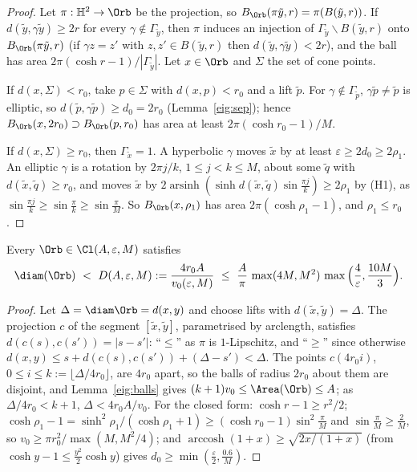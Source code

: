 \begin{proof}
Let $\pi:\mathbb H^2\to\Orb$ be the projection, so $B_\Orb(\pi\tilde y,r)=\pi(B(\tilde y,r))$. If $d(\tilde y,\gamma\tilde y)\ge2r$ for every $\gamma\notin\Gamma_{\tilde y}$, then $\pi$ induces an injection of $\Gamma_{\tilde y}\backslash B(\tilde y,r)$ onto $B_\Orb(\pi\tilde y,r)$ (if $\gamma z=z'$ with $z,z'\in B(\tilde y,r)$ then $d(\tilde y,\gamma\tilde y)<2r$), and the ball has area $2\pi(\cosh r-1)/|\Gamma_{\tilde y}|$. Let $x\in\Orb$ and $\Sigma$ the set of cone points.

If $d(x,\Sigma)<r_0$, take $p\in\Sigma$ with $d(x,p)<r_0$ and a lift $\tilde p$. For $\gamma\notin\Gamma_{\tilde p}$, $\gamma\tilde p\ne\tilde p$ is elliptic, so $d(\tilde p,\gamma\tilde p)\ge d_0=2r_0$ (Lemma~\ref{eig:sep}); hence $B_\Orb(x,2r_0)\supset B_\Orb(p,r_0)$ has area at least $2\pi(\cosh r_0-1)/M$.

If $d(x,\Sigma)\ge r_0$, then $\Gamma_{\tilde x}=1$. A hyperbolic $\gamma$ moves $\tilde x$ by at least $\varepsilon\ge2d_0\ge2\rho_1$. An elliptic $\gamma$ is a rotation by $2\pi j/k$, $1\le j<k\le M$, about some $\tilde q$ with $d(\tilde x,\tilde q)\ge r_0$, and moves $\tilde x$ by $2\operatorname{arsinh}(\sinh d(\tilde x,\tilde q)\sin\frac{\pi j}k)\ge2\rho_1$ by (H1), as $\sin\frac{\pi j}k\ge\sin\frac\pi k\ge\sin\frac\pi M$. So $B_\Orb(x,\rho_1)$ has area $2\pi(\cosh\rho_1-1)$, and $\rho_1\le r_0$.
\end{proof}

\begin{theorem}\label{eig:diam}
Every $\Orb\in\Cl(A,\varepsilon,M)$ satisfies
\[
  \diam(\Orb)\ <\ D(A,\varepsilon,M):=\frac{4r_0A}{v_0(\varepsilon,M)}\ \le\ \frac A\pi\,\max(4M,M^2)\,\max\Big(\frac4\varepsilon,\frac{10M}3\Big).
\]
\end{theorem}

\begin{proof}
Let $\Delta=\diam\Orb=d(x,y)$ and choose lifts with $d(\tilde x,\tilde y)=\Delta$. The projection $c$ of the segment $[\tilde x,\tilde y]$, parametrised by arclength, satisfies $d(c(s),c(s'))=|s-s'|$: ``$\le$'' as $\pi$ is $1$-Lipschitz, and ``$\ge$'' since otherwise $d(x,y)\le s+d(c(s),c(s'))+(\Delta-s')<\Delta$. The points $c(4r_0i)$, $0\le i\le k:=\lfloor\Delta/4r_0\rfloor$, are $4r_0$ apart, so the balls of radius $2r_0$ about them are disjoint, and Lemma~\ref{eig:balls} gives $(k+1)v_0\le\Area(\Orb)\le A$; as $\Delta/4r_0<k+1$, $\Delta<4r_0A/v_0$.
For the closed form: $\cosh r-1\ge r^2/2$; $\cosh\rho_1-1=\sinh^2\rho_1/(\cosh\rho_1+1)\ge(\cosh r_0-1)\sin^2\frac\pi M$ and $\sin\frac\pi M\ge\frac2M$, so $v_0\ge\pi r_0^2/\max(M,M^2/4)$; and $\operatorname{arccosh}(1+x)\ge\sqrt{2x/(1+x)}$ (from $\cosh y-1\le\frac{y^2}2\cosh y$) gives $d_0\ge\min(\frac\varepsilon2,\frac{0.6}M)$.
\end{proof}

